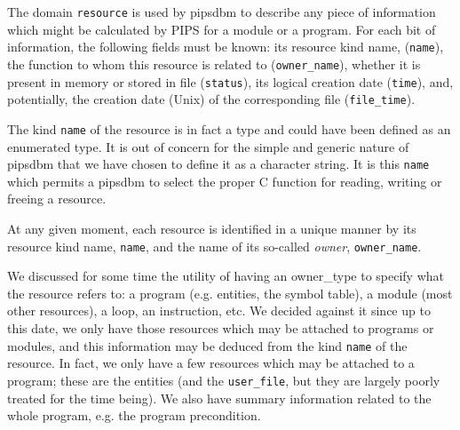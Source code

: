 \documentclass[a4paper]{article}
\begin{document}
{ The domain {\tt resource} is used by
  pipsdbm to describe any piece of information which might be
  calculated by PIPS for a module or a program. For each bit of
  information, the following fields must be known: its resource kind
  name, ({\tt name}), the function to whom this resource is related to
  ({\tt owner\_name}), whether it is present in memory or stored in
  file ({\tt status}), its logical creation date ({\tt time}), and,
  potentially, the creation date (Unix) of the corresponding file
  ({\tt file\_time}).
 
The kind {\tt name} of the resource is in fact a type and could have been
defined as an enumerated type. It is out of concern for the simple and
generic nature of pipsdbm that we have chosen to define it as a
character string. It is this {\tt name} which permits a pipsdbm to
select the proper C function for reading, writing or freeing a resource.

At any given moment, each resource is identified in a unique manner by
its resource kind name, \texttt{name}, and the name of its so-called
{\em owner}, \texttt{owner\_name}.
 
We discussed for some time the utility of having an owner\_type to
specify what the resource refers to: a program (e.g. entities, the
symbol table), a module (most other resources), a
loop, an instruction, etc. We decided against it since up to this date,
we only have those resources which may be attached to programs or
modules, and this information may be deduced from the kind {\tt name} of
the resource. In fact, we only have a few resources which may be
attached to a program; these are the entities (and the
\texttt{user\_file}, but they are largely poorly treated for the
time being). We also have summary information related to the whole
program, e.g. the program precondition.}
 
\end{document}
